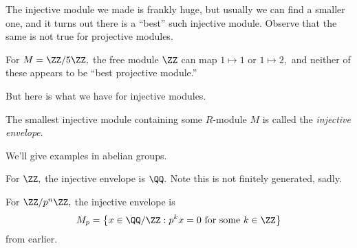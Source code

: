 \documentclass[../notes.tex]{subfiles}
\begin{document}
The injective module we made is frankly huge, but usually we can find a smaller one, and it turns out there is a ``best'' such injective module. Observe that the same is not true for projective modules.
\begin{example}
	For $M=\ZZ/5\ZZ,$ the free module $\ZZ$ can map $1\mapsto1$ or $1\mapsto2,$ and neither of these appears to be ``best projective module.''
\end{example}
But here is what we have for injective modules.
\begin{definition}
	The smallest injective module containing some $R$-module $M$ is called the \textit{injective envelope}.
\end{definition}
We'll give examples in abelian groups.
\begin{example}
	For $\ZZ,$ the injective envelope is $\QQ.$ Note this is not finitely generated, sadly.
\end{example}
\begin{example}
	For $\ZZ/p^n\ZZ,$ the injective envelope is
	\[M_p=\left\{x\in\QQ/\ZZ:p^kx=0\text{ for some }k\in\ZZ\right\}\]
	from earlier.
\end{example}
\end{document}
